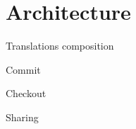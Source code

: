 \documentclass[ignorenonframetext,red]{beamer}
\begin{document}
\section{Architecture}

\begin{frame}{Translations composition}
  
\end{frame}

\begin{frame}{Commit}
  
\end{frame}

\begin{frame}{Checkout}
  
\end{frame}

\begin{frame}{Sharing}
  
\end{frame}
\end{document}
